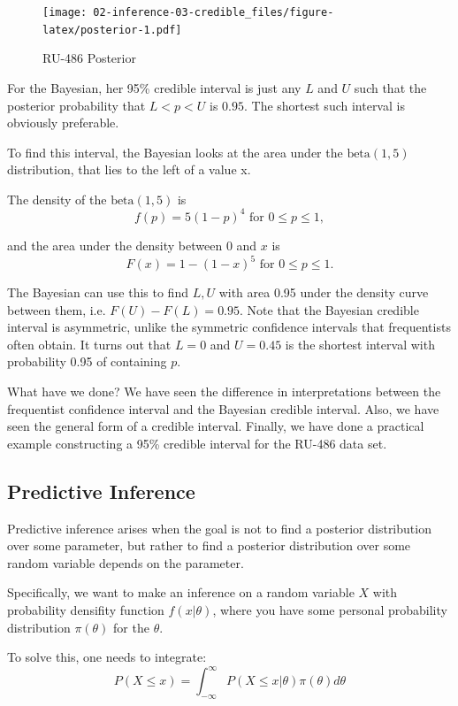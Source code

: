 \documentclass[]{book}
\theoremstyle{definition}
\theoremstyle{definition}
\theoremstyle{definition}
\theoremstyle{remark}
\begin{document}
\begin{figure}[htbp]
\centering
\texttt{[image: 02-inference-03-credible\_files/figure-latex/posterior-1.pdf]}
\caption{\label{fig:posterior}RU-486 Posterior}
\end{figure}

For the Bayesian, her 95\% credible interval is just any \(L\) and \(U\)
such that the posterior probability that \(L < p < U\) is \(0.95\). The
shortest such interval is obviously preferable.

To find this interval, the Bayesian looks at the area under the
\(\text{beta}(1,5)\) distribution, that lies to the left of a value x.

The density of the \(\text{beta}(1,5)\) is
\[f(p) = 5 (1-p)^4 \text{ for } 0 \leq p \leq 1,\]

and the area under the density between \(0\) and \(x\) is
\[F(x) = 1 - (1-x)^5 \text{ for } 0 \leq p \leq 1.\]

The Bayesian can use this to find \(L, U\) with area 0.95 under the
density curve between them, i.e. \(F(U) − F(L) = 0.95\). Note that the
Bayesian credible interval is asymmetric, unlike the symmetric
confidence intervals that frequentists often obtain. It turns out that
\(L = 0\) and \(U = 0.45\) is the shortest interval with probability
0.95 of containing \(p\).

What have we done? We have seen the difference in interpretations
between the frequentist confidence interval and the Bayesian credible
interval. Also, we have seen the general form of a credible interval.
Finally, we have done a practical example constructing a 95\% credible
interval for the RU-486 data set.

\subsection{Predictive Inference}\label{predictive-inference}

Predictive inference arises when the goal is not to find a posterior
distribution over some parameter, but rather to find a posterior
distribution over some random variable depends on the parameter.

Specifically, we want to make an inference on a random variable \(X\)
with probability densifity function \(f(x|\theta)\), where you have some
personal probability distribution \(\pi(\theta)\) for the \(\theta\).

To solve this, one needs to integrate:
\[P(X \leq x) = \int^{\infty}_{-\infty} P(X \leq x | \theta)\pi(\theta)d\theta\]
\end{document}
